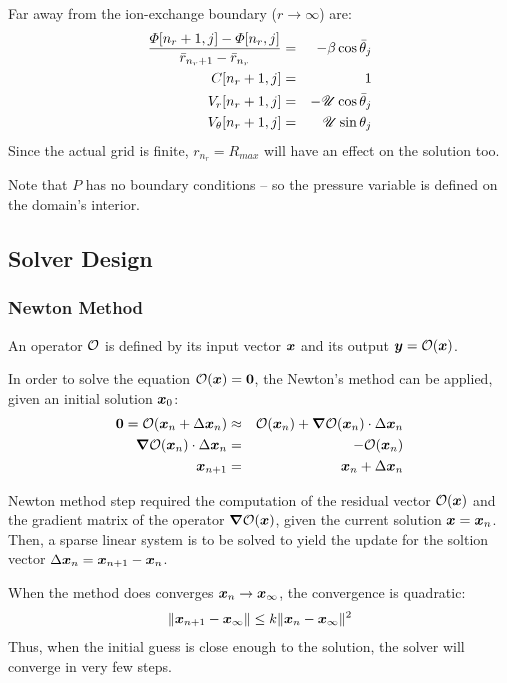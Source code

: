 Far away from the ion-exchange boundary ($r\rightarrow\infty$) are:
\begin{eqnarray}
\frac{\varPhi[n_r + 1, j] - \varPhi[n_r, j]}{\bar{r}_{n_r + 1} - \bar{r}_{n_r}} 
 & = & -\beta \cos\bar{\theta}_j \\
C[n_r + 1, j] & = & 1 \\
V_r[n_r + 1, j] & = & -\mathscr{U} \cos\bar{\theta}_j \\
V_\theta[n_r + 1, j] & = & \mathscr{U} \sin\theta_j
\end{eqnarray}
Since the actual grid is finite, $r_{n_r} = R_{max}$ will have an effect on the solution too.

Note that $P$ has no boundary conditions -- so the pressure variable is defined 
on the domain's interior.

\subsection{Solver Design}
\subsubsection{Newton Method}
An operator $\mathcal{O}$ is defined by its input vector $\boldsymbol{x}$ and its output 
$\boldsymbol{y} = \mathcal{O}(\boldsymbol{x})$.

In order to solve the equation $\mathcal{O}(\boldsymbol{x}) = \boldsymbol{0}$, the Newton's method can 
be applied, given an initial solution $\boldsymbol{x}_0$:
\begin{eqnarray}
\boldsymbol{0} = \mathcal{O}(\boldsymbol{x}_n + \Delta \boldsymbol{x}_n) &\approx& \mathcal{O}(\boldsymbol{x}_n) + \boldsymbol{\nabla} \mathcal{O}(\boldsymbol{x}_n)\cdot\Delta\boldsymbol{x}_n \\
\boldsymbol{\nabla} \mathcal{O}(\boldsymbol{x}_n) \cdot \Delta \boldsymbol{x}_n &=& -\mathcal{O}(\boldsymbol{x}_n) \\
\boldsymbol{x}_{n+1} &=& \boldsymbol{x}_{n} + \Delta \boldsymbol{x}_n 
\end{eqnarray}

Newton method step required the computation of the residual vector $\mathcal{O}(\boldsymbol{x})$ and
the gradient matrix of the operator $\boldsymbol{\nabla} \mathcal{O}(\boldsymbol{x})$, 
given the current solution $\boldsymbol{x} = \boldsymbol{x}_n$.
Then, a sparse linear system is to be solved to yield the update for the soltion vector
$\Delta \boldsymbol{x}_n = \boldsymbol{x}_{n+1} - \boldsymbol{x}_n$.

When the method does converges $\boldsymbol{x}_n \rightarrow \boldsymbol{x}_\infty$, 
the convergence is quadratic:
\begin{eqnarray}
\|\boldsymbol{x}_{n+1} - \boldsymbol{x}_\infty\| \le k \|\boldsymbol{x}_{n} - \boldsymbol{x}_\infty\|^2
\end{eqnarray}
Thus, when the initial guess is close enough to the solution, the solver
will converge in very few steps.


